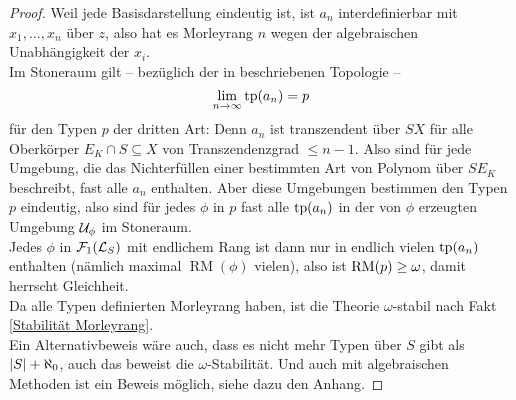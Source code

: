 \begin{proof}
        Weil jede Basisdarstellung eindeutig ist, ist $a_n$ interdefinierbar mit $x_1,\dots,x_n$ über $z$, also hat es Morleyrang $n$ wegen der algebraischen Unabhängigkeit der $x_i$.\\
        Im Stoneraum gilt \--- bezüglich der in \cite{Lukas} beschriebenen Topologie \--- $$\lim\limits_{n\rightarrow\infty}\operatorname{tp}(a_n)=p$$ für den Typen $p$ der dritten Art: Denn $a_n$ ist transzendent über $SX$ für alle Oberkörper $E_K\cap S\subseteq X$ von Transzendenzgrad $\leq n-1$. Also sind für jede Umgebung, die das Nichterfüllen einer bestimmten Art von Polynom über $SE_K$ beschreibt, fast alle $a_n$ enthalten. Aber diese Umgebungen bestimmen den Typen $p$ eindeutig, also sind für jedes $\phi$ in $p$ fast alle $\operatorname{tp}(a_n)$ in der von $\phi$ erzeugten Umgebung $\mathcal{U}_\phi$ im Stoneraum.\\
        Jedes $\phi$ in $\mathcal{F}_1(\mathcal{L}_S)$ mit endlichem Rang ist dann nur in endlich vielen $\operatorname{tp}(a_n)$ enthalten (nämlich maximal $\operatorname{RM}(\phi)$ vielen), also ist $\operatorname{RM}(p)\geq\omega$, damit herrscht Gleichheit.\\
        Da alle Typen definierten Morleyrang haben, ist die Theorie $\omega$-stabil  nach Fakt \ref{Stabilität Morleyrang}.\\
        Ein Alternativbeweis wäre auch, dass es nicht mehr Typen über $S$ gibt als ${\left| S \right|}+\aleph_0$, auch das beweist die $\omega$-Stabilität. Und auch mit algebraischen Methoden ist ein Beweis möglich, siehe dazu den Anhang.
    \end{proof}